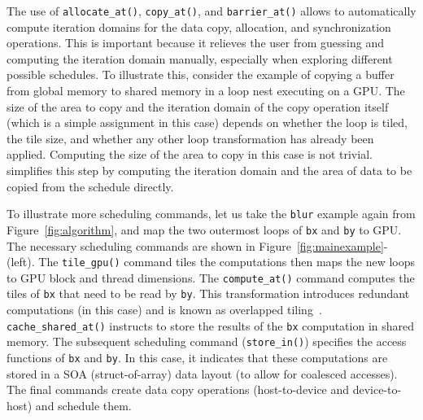 \begin{figure*}[t]
\begin{tabular}{cl|@{}l}

\\\hline
\end{tabular}
\vspace{-0.25cm}
\caption{Two examples illustrating \framework{} scheduling commands (left) and the corresponding generated code (right). (a) presents a set of scheduling commands for mapping to GPU; (b) presents a set of scheduling commands for mapping to a distributed CPU machine}
\label{fig:mainexample}
\vspace{-0.25cm}
\end{figure*}


The use of \texttt{allocate\_at()}, \texttt{copy\_at()}, and \texttt{barrier\_at()} allows \framework to automatically compute iteration domains for the data copy, allocation, and synchronization operations.  This is important because it relieves the user from guessing and computing the iteration domain manually, especially when exploring different possible schedules.  To illustrate this, consider the example of copying a buffer from global memory to shared memory in a loop nest executing on a GPU.  The size of the area to copy and the iteration domain of the copy operation itself (which is a simple assignment in this case) depends on whether the loop is tiled, the tile size, and  whether any other loop transformation has already been applied. Computing the size of the area to copy in this case is not trivial.  \framework simplifies this step by computing the iteration domain and the area of data to be copied from the schedule directly.

To illustrate more \framework{} scheduling commands, let us take the \texttt{blur} example again from Figure~\ref{fig:algorithm},
and map the two outermost loops of \texttt{bx} and \texttt{by} to GPU.  The necessary scheduling commands are shown in Figure~\ref{fig:mainexample}-\codetwo{} (left).
The \texttt{tile\_gpu()} command tiles the computations then maps the new loops to GPU block and thread dimensions.  The \texttt{compute\_at()} command computes the tiles of \texttt{bx} that need to be read by \texttt{by}.  This transformation introduces redundant computations (in this case) and is known as overlapped tiling~\cite{Krishnamoorthy:2007:EAP:1273442.1250761}.
\texttt{cache\_shared\_at()} instructs \framework to store the results of the \texttt{bx} computation in shared memory.
The subsequent scheduling command (\texttt{store\_in()}) specifies the access functions of \texttt{bx} and \texttt{by}.  In this case, it indicates that these computations are stored in a SOA (struct-of-array) data layout (to allow for coalesced accesses).  The final commands create data copy operations (host-to-device and device-to-host) and schedule them.

